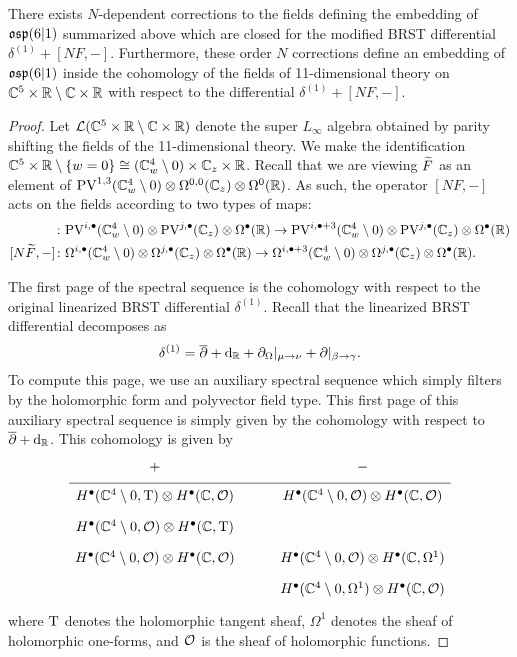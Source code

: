 \begin{prop}
There exists $N$-dependent corrections to the fields defining the embedding of $\mathfrak{osp}(6|1)$ summarized above which are closed for the modified BRST differential $\delta^{(1)} + [N F,-]$. 
Furthermore, these order $N$ corrections define an embedding of $\mathfrak{osp}(6|1)$ inside the cohomology of the fields of 11-dimensional theory on $\mathbb C^5 \times \mathbb R \setminus \mathbb C \times \mathbb R$ with respect to the differential $\delta^{(1)} + [N  F,-]$.
\end{prop}

\begin{proof}
Let $\mathcal L(\mathbb C^5 \times \mathbb R \setminus \mathbb C \times \mathbb R)$ denote the super $L_\infty$ algebra obtained by parity shifting the fields of the 11-dimensional theory. 
We make the identification $\mathbb C^5 \times \mathbb R \setminus \{w=0\} \cong (\mathbb C_w^4 \setminus 0) \times \mathbb C_z \times \mathbb R$. 
Recall that we are viewing $\widetilde F$ as an element of ${\rm PV}^{1,3}(\mathbb C_w^4 \setminus 0) \otimes \Omega^{0,0}(\mathbb C_z) \otimes \Omega^0(\mathbb R)$. 
As such, the operator $[N F,-]$ acts on the fields according to two types of maps:
\begin{align*}
[N \til F ,-] & \colon \PV^{i,\bu}(\CC^4_w \setminus 0) \otimes \PV^{j,\bu} (\CC_z) \otimes \Omega^\bu (\RR) \to \PV^{i,\bu+3}(\CC^4_w \setminus 0) \otimes \PV^{j,\bu} (\CC_z) \otimes \Omega^\bu (\RR) \\
[N \til F,-] & \colon \Omega^{i,\bu}(\CC^4_w \setminus 0) \otimes \Omega^{j,\bu} (\CC_z) \otimes \Omega^\bu (\RR) \to \Omega^{i,\bu+3}(\CC^4_w \setminus 0) \otimes \Omega^{j,\bu} (\CC_z) \otimes \Omega^\bu (\RR).
\end{align*}



The first page of the spectral sequence is the cohomology with respect to the original linearized BRST differential $\delta^{(1)}$. 
Recall that the linearized BRST differential decomposes as
\[
\delta^{(1)} = \overline{\partial} + {\rm d}_{\mathbb R} + \partial_{\Omega} |_{\mu \to \nu} + \partial |_{\beta \to \gamma}  .
\]
To compute this page, we use an auxiliary spectral sequence which simply filters by the holomorphic form and polyvector field type. 
This first page of this auxiliary spectral sequence is simply given by the cohomology with respect to $\overline{\partial} + {\rm d}_{\mathbb R}$. 
This cohomology is given by
\begin{equation}
  \label{eqn:ads4ss} 
  \begin{tikzcd}[row sep = 1 ex]
    + & - \\ \hline
H^\bu(\CC^4\setminus 0, \T) \otimes H^\bu(\CC, \cO) & H^\bu(\CC^4 \setminus 0, \cO) \otimes H^\bu(\CC, \cO) \\
H^\bu(\CC^4\setminus 0, \cO) \otimes H^\bu(\CC, \T) \\
H^\bu(\CC^4\setminus 0, \cO) \otimes H^\bu(\CC, \cO) & H^\bu(\CC^4\setminus 0, \cO) \otimes H^\bu(\CC, \Omega^1) \\ & H^\bu(\CC^4\setminus 0, \Omega^1) \otimes H^\bu(\CC, \cO)  
\end{tikzcd}
\end{equation}
where ${\rm T}$ denotes the holomorphic tangent sheaf, $\Omega^1$ denotes the sheaf of holomorphic one-forms, and $\mathcal O$ is the sheaf of holomorphic functions.


\end{proof}
